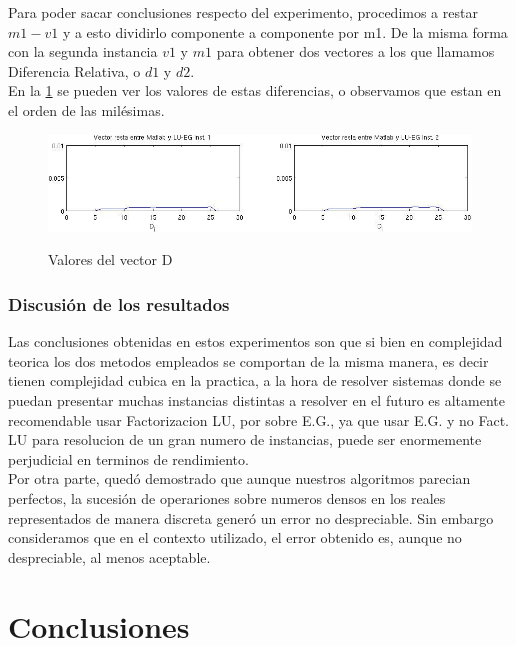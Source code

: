 \documentclass[12pt,a4paper]{article}
\begin{document}
Para poder sacar conclusiones respecto del experimento, procedimos a restar $m1 - v1$ y a esto dividirlo componente a componente por m1. De la misma forma con la segunda instancia $v1$ y $m1$ para obtener dos vectores a los que llamamos Diferencia Relativa, o $d1$ y $d2$.\\

En la \ref{VectorResta} se pueden ver los valores de estas diferencias, o observamos que estan en el orden de las milésimas.  

\begin{figure}[h!]
\centering
\caption{Valores del vector D}
\includegraphics[width=17cm]{VectorRestaRelativa.jpg}
\label{VectorResta}
\end{figure}

\subsubsection{Discusión de los resultados}

Las conclusiones obtenidas en estos experimentos son que si bien en complejidad teorica los dos metodos empleados se comportan de la misma manera, es decir tienen complejidad cubica en la practica, a la hora de resolver sistemas donde se puedan presentar muchas instancias distintas a resolver en el futuro es altamente recomendable usar Factorizacion LU, por sobre E.G., ya que usar E.G. y no Fact. LU para resolucion de un gran numero de instancias, puede ser enormemente perjudicial en terminos de rendimiento. \\

Por otra parte, quedó demostrado que aunque nuestros algoritmos parecian perfectos, la sucesión de operariones sobre numeros densos en los reales representados de manera discreta generó un error no despreciable. 
Sin embargo consideramos que en el contexto utilizado, el error obtenido es, aunque no despreciable, al menos aceptable.


\section{Conclusiones}
\end{document}
